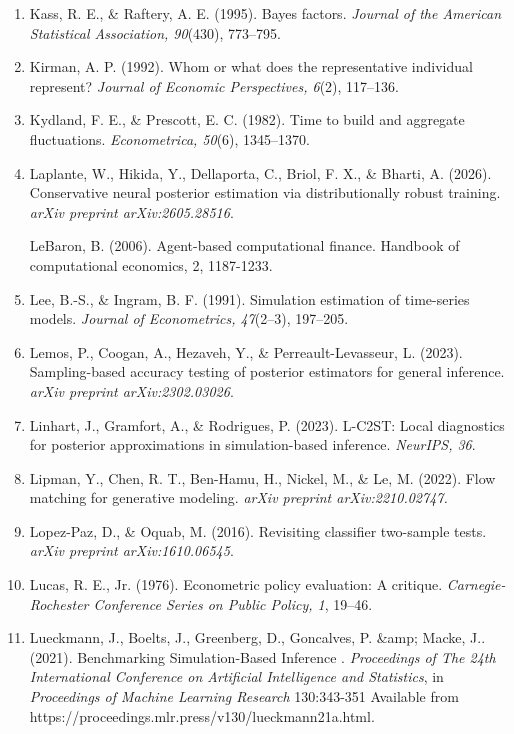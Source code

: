 \documentclass[12pt]{article}
\begin{document}
\begin{enumerate}
\item Kass, R. E., \& Raftery, A. E. (1995). Bayes factors. \textit{Journal of the American Statistical Association, 90}(430), 773--795.

\item Kirman, A. P. (1992). Whom or what does the representative individual represent? \textit{Journal of Economic Perspectives, 6}(2), 117--136.

\item Kydland, F. E., \& Prescott, E. C. (1982). Time to build and aggregate fluctuations. \textit{Econometrica, 50}(6), 1345--1370.

\item Laplante, W., Hikida, Y., Dellaporta, C., Briol, F. X., \& Bharti, A. (2026). Conservative neural posterior estimation via distributionally robust training. \textit{arXiv preprint arXiv:2605.28516}.

\text LeBaron, B. (2006). Agent-based computational finance. Handbook of computational economics, 2, 1187-1233.

\item Lee, B.-S., \& Ingram, B. F. (1991). Simulation estimation of time-series models. \textit{Journal of Econometrics, 47}(2--3), 197--205.

\item Lemos, P., Coogan, A., Hezaveh, Y., \& Perreault-Levasseur, L. (2023). Sampling-based accuracy testing of posterior estimators for general inference. \textit{arXiv preprint arXiv:2302.03026}.

\item Linhart, J., Gramfort, A., \& Rodrigues, P. (2023). L-C2ST: Local diagnostics for posterior approximations in simulation-based inference. \textit{NeurIPS, 36}.

\item Lipman, Y., Chen, R. T., Ben-Hamu, H., Nickel, M., \& Le, M. (2022). Flow matching for generative modeling. \textit{arXiv preprint arXiv:2210.02747.}

\item Lopez-Paz, D., \& Oquab, M. (2016). Revisiting classifier two-sample tests. \textit{arXiv preprint arXiv:1610.06545}.

\item Lucas, R. E., Jr. (1976). Econometric policy evaluation: A critique. \textit{Carnegie-Rochester Conference Series on Public Policy, 1}, 19--46.

\item Lueckmann, J., Boelts, J., Greenberg, D., Goncalves, P. \&amp; Macke, J.. (2021).  Benchmarking Simulation-Based Inference . \textit{Proceedings of The 24th International Conference on Artificial Intelligence and Statistics}, in \textit{Proceedings of Machine Learning Research} 130:343-351 Available from https://proceedings.mlr.press/v130/lueckmann21a.html.


\end{enumerate}
\end{document}
